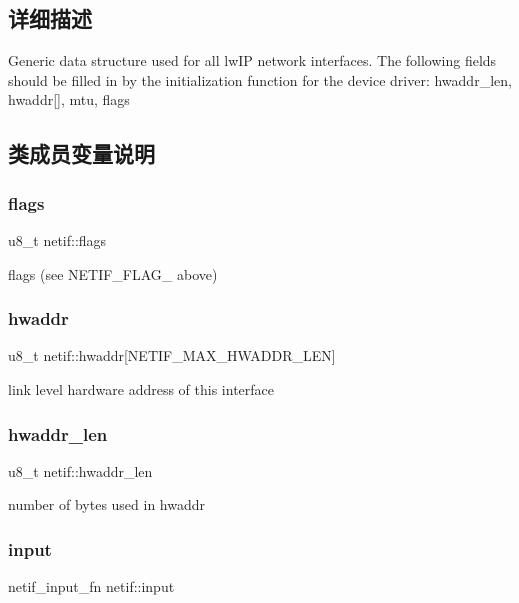 \subsection{详细描述}
Generic data structure used for all lw\+IP network interfaces. The following fields should be filled in by the initialization function for the device driver\+: hwaddr\+\_\+len, hwaddr\mbox{[}\mbox{]}, mtu, flags 

\subsection{类成员变量说明}
\mbox{\label{structnetif_a1c171db6097bbb6f09f63549a66e00ea}} 
\subsubsection{\texorpdfstring{flags}{flags}}
{\footnotesize\ttfamily u8\+\_\+t netif\+::flags}

flags (see N\+E\+T\+I\+F\+\_\+\+F\+L\+A\+G\+\_\+ above) \mbox{\label{structnetif_ab91f76223d5a7f1a64f03ac9dd7113a4}} 
\subsubsection{\texorpdfstring{hwaddr}{hwaddr}}
{\footnotesize\ttfamily u8\+\_\+t netif\+::hwaddr\mbox{[}N\+E\+T\+I\+F\+\_\+\+M\+A\+X\+\_\+\+H\+W\+A\+D\+D\+R\+\_\+\+L\+EN\mbox{]}}

link level hardware address of this interface \mbox{\label{structnetif_afe1181561cb16241f3cb5ed01e567d42}} 
\subsubsection{\texorpdfstring{hwaddr\+\_\+len}{hwaddr\_len}}
{\footnotesize\ttfamily u8\+\_\+t netif\+::hwaddr\+\_\+len}

number of bytes used in hwaddr \mbox{\label{structnetif_a8fe4f1b7b0d710216287da9615164a5c}} 
\subsubsection{\texorpdfstring{input}{input}}
{\footnotesize\ttfamily netif\+\_\+input\+\_\+fn netif\+::input}

